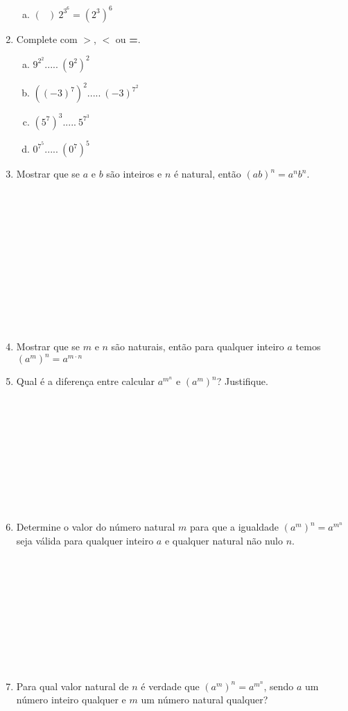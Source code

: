 \documentclass[a4paper,14pt]{article}
\begin{document}
\begin{multicols}{2}
\begin{enumerate}
\begin{enumerate}[a)]
    			\item $(~~~)~2^{3^6} = (2^3)^6$
    		\end{enumerate}
    		\item Complete com $\boldsymbol{>}$, $\boldsymbol{<}$ ou \textbf{=}.
    		\begin{enumerate}[a)]
    			\item $9^{2^2} .....~(9^2)^2$
    			\item $((-3)^7)^2 .....~(-3)^{7^2}$
    			\item $(5^7)^3 .....~5^{7^3}$
    			\item $0^{7^5} .....~(0^7)^5$
    		\end{enumerate}
    		\item Mostrar que se $a$ e $b$ são inteiros e $n$ é natural, então $(ab)^n = a^nb^n$. \\\\\\\\\\\\\\\\\\\\\\\\
    		\item Mostrar que se $m$ e $n$ são naturais, então para qualquer inteiro $a$ temos $(a^m)^n = a^{m \cdot n}$ \newpage
    		\item Qual é a diferença entre calcular $a^{m^n}$ e $(a^m)^n$? Justifique. \\\\\\\\\\\\\\\\\\\\
    		\item Determine o valor do número natural $m$ para que a igualdade $(a^m)^n = a^{m^n}$ seja válida para qualquer inteiro $a$ e qualquer natural não nulo $n$. \\\\\\\\\\\\\\\\\\\\
    		\item Para qual valor natural de $n$ é verdade que $(a^m)^n = a^{m^n}$, sendo $a$ um número inteiro qualquer e $m$ um número natural qualquer?
    		

\end{enumerate}
\end{multicols}
\end{document}

